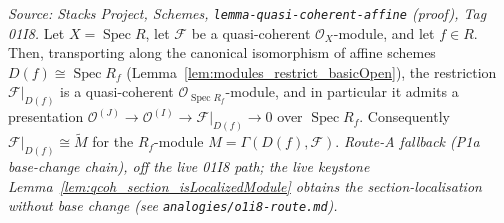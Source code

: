 \begin{lemma}
  \label{lem:isQuasicoherent_restrict_basicOpen}
  \textit{Source: Stacks Project, Schemes, \texttt{lemma-quasi-coherent-affine} (proof),
  Tag 01I8.}
  Let \(X = \operatorname{Spec} R\), let \(\mathcal{F}\) be a quasi-coherent
  \(\mathcal{O}_X\)-module, and let \(f \in R\). Then, transporting along the canonical
  isomorphism of affine schemes \(D(f) \cong \operatorname{Spec} R_f\)
  (Lemma~\ref{lem:modules_restrict_basicOpen}), the restriction \(\mathcal{F}|_{D(f)}\) is a
  quasi-coherent \(\mathcal{O}_{\operatorname{Spec} R_f}\)-module, and in particular it admits a
  presentation \(\mathcal{O}^{(J)} \to \mathcal{O}^{(I)} \to \mathcal{F}|_{D(f)} \to 0\) over
  \(\operatorname{Spec} R_f\). Consequently \(\mathcal{F}|_{D(f)} \cong \widetilde{M}\) for the
  \(R_f\)-module \(M = \Gamma(D(f), \mathcal{F})\).
  \emph{Route-A fallback (P1a base-change chain), off the live 01I8 path; the live keystone
  Lemma~\ref{lem:qcoh_section_isLocalizedModule} obtains the section-localisation without base
  change (see \texttt{analogies/o1i8-route.md}).}
\end{lemma}
